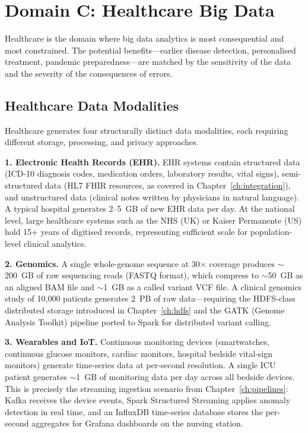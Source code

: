 \section{Domain C: Healthcare Big Data}
\label{sec:healthcare}

Healthcare is the domain where big data analytics is most consequential
and most constrained. The potential benefits---earlier disease detection,
personalised treatment, pandemic preparedness---are matched by the
sensitivity of the data and the severity of the consequences of errors.

\subsection{Healthcare Data Modalities}
\label{subsec:health-modalities}

Healthcare generates four structurally distinct data modalities, each
requiring different storage, processing, and privacy approaches.

\textbf{1. Electronic Health Records (EHR).} EHR systems contain structured
data (ICD-10 diagnosis codes, medication orders, laboratory results,
vital signs), semi-structured data (HL7 FHIR resources, as covered in
Chapter~\ref{ch:integration}), and unstructured data (clinical notes
written by physicians in natural language). A typical hospital generates
2--5~GB of new EHR data per day. At the national level, large healthcare
systems such as the NHS (UK) or Kaiser Permanente (US) hold 15+ years of
digitised records, representing sufficient scale for population-level clinical analytics.

\textbf{2. Genomics.} A single whole-genome sequence at 30$\times$ coverage
produces $\sim$200~GB of raw sequencing reads (FASTQ format), which compress
to $\sim$50~GB as an aligned BAM file and $\sim$1~GB as a called variant VCF
file. A clinical genomics study of 10{,}000 patients generates 2~PB of raw
data---requiring the HDFS-class distributed storage introduced in
Chapter~\ref{ch:hdfs} and the GATK (Genome Analysis Toolkit) pipeline
ported to Spark for distributed variant calling.

\textbf{3. Wearables and IoT.} Continuous monitoring devices (smartwatches,
continuous glucose monitors, cardiac monitors, hospital bedside vital-sign
monitors) generate time-series data at per-second resolution. A single
ICU patient generates $\sim$1~GB of monitoring data per day across
all bedside devices. This is precisely the streaming ingestion scenario
from Chapter~\ref{ch:pipelines}: Kafka receives the device events,
Spark Structured Streaming applies anomaly detection in real time, and
an InfluxDB time-series database stores the per-second aggregates for
Grafana dashboards on the nursing station.

